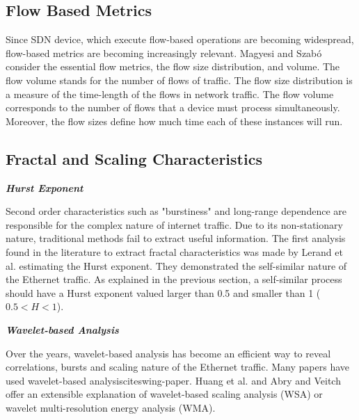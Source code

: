 \subsection{Flow Based Metrics}


Since SDN device, which execute flow-based operations are becoming widespread, flow-based metrics are becoming increasingly relevant\cite{validate-trafficgen}\cite{sdn-survey}. Magyesi and Szabó\cite{validate-trafficgen} consider the essential flow metrics, the flow size distribution, and volume. The flow volume stands for the number of flows of traffic. The flow size distribution is a measure of the time-length of the flows in network traffic. The flow volume corresponds to the number of flows that a device must process simultaneously. Moreover, the flow sizes define how much time each of these instances will run.


\subsection{Fractal and Scaling Characteristics}

\smallskip \noindent \textbf{\textit{Hurst Exponent}}

Second order characteristics such as "burstiness" and long-range dependence are responsible for the complex nature of internet traffic\cite{validate-trafficgen}. Due to its non-stationary nature, traditional methods fail to extract useful information\cite{validate-trafficgen}. The first analysis found in the literature to extract fractal characteristics was made by Lerand et al. estimating the  Hurst exponent\cite{selfsimilar-ethernet}. They demonstrated the self-similar nature of the Ethernet traffic. As explained in the previous section, a self-similar process should have a Hurst exponent valued larger than 0.5 and smaller than 1 ($0.5 < H < 1$).

\smallskip \noindent \textbf{\textit{Wavelet-based Analysis}}

Over the years, wavelet-based analysis has become an efficient way to reveal correlations, bursts and scaling nature of the Ethernet traffic\cite{validate-trafficgen}. Many papers have used wavelet-based analysiscite{swing-paper}\cite{non-intrusive-wavelet}\cite{wavelet-analysis-long-range}. Huang et al.\cite{non-intrusive-wavelet} and Abry and Veitch\cite{wavelet-analysis-long-range} offer an extensible explanation of wavelet-based scaling analysis (\acrshort{WSA}) or wavelet multi-resolution energy analysis (\acrshort{WMA}).  

